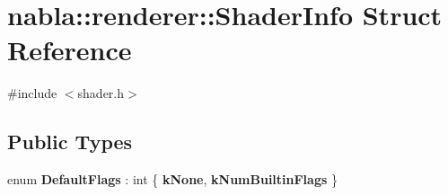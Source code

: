 \hypertarget{structnabla_1_1renderer_1_1_shader_info}{}\section{nabla\+::renderer\+::Shader\+Info Struct Reference}
\label{structnabla_1_1renderer_1_1_shader_info}


{\ttfamily \#include $<$shader.\+h$>$}

\subsection*{Public Types}
\begin{DoxyCompactItemize}
\item 
\mbox{\label{structnabla_1_1renderer_1_1_shader_info_a7c0e0662b2426420c94f29325190db99}} 
enum {\bfseries Default\+Flags} \+: int \{ {\bfseries k\+None}, 
{\bfseries k\+Num\+Builtin\+Flags}
 \}
\end{DoxyCompactItemize}
